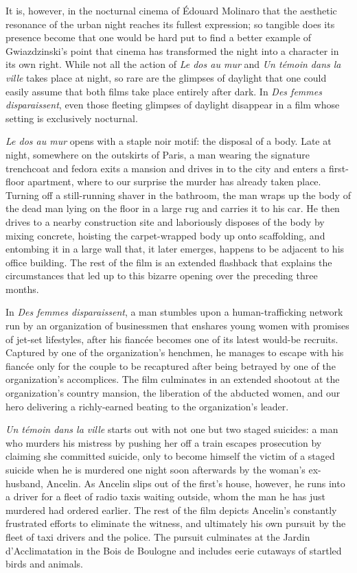 \documentclass[
  letterpaper,
  DIV=11,
  numbers=noendperiod,
  oneside]{scrartcl}
\begin{document}
\marginnote{\begin{footnotesize}

\end{footnotesize}}

It is, however, in the nocturnal cinema of Édouard Molinaro that the
aesthetic resonance of the urban night reaches its fullest expression;
so tangible does its presence become that one would be hard put to find
a better example of Gwiazdzinski's point that cinema has transformed the
night into a character in its own right. While not all the action of
\emph{Le dos au mur} and \emph{Un témoin dans la ville} takes place at
night, so rare are the glimpses of daylight that one could easily assume
that both films take place entirely after dark. In \emph{Des femmes
disparaissent}, even those fleeting glimpses of daylight disappear in a
film whose setting is exclusively nocturnal.

\emph{Le dos au mur} opens with a staple noir motif: the disposal of a
body. Late at night, somewhere on the outskirts of Paris, a man wearing
the signature trenchcoat and fedora exits a mansion and drives in to the
city and enters a first-floor apartment, where to our surprise the
murder has already taken place. Turning off a still-running shaver in
the bathroom, the man wraps up the body of the dead man lying on the
floor in a large rug and carries it to his car. He then drives to a
nearby construction site and laboriously disposes of the body by mixing
concrete, hoisting the carpet-wrapped body up onto scaffolding, and
entombing it in a large wall that, it later emerges, happens to be
adjacent to his office building. The rest of the film is an extended
flashback that explains the circumstances that led up to this bizarre
opening over the preceding three months.

In \emph{Des femmes disparaissent}, a man stumbles upon a
human-trafficking network run by an organization of businessmen that
enshares young women with promises of jet-set lifestyles, after his
fiancée becomes one of its latest would-be recruits. Captured by one of
the organization's henchmen, he manages to escape with his fiancée only
for the couple to be recaptured after being betrayed by one of the
organization's accomplices. The film culminates in an extended shootout
at the organization's country mansion, the liberation of the abducted
women, and our hero delivering a richly-earned beating to the
organization's leader.

\emph{Un témoin dans la ville} starts out with not one but two staged
suicides: a man who murders his mistress by pushing her off a train
escapes prosecution by claiming she committed suicide, only to become
himself the victim of a staged suicide when he is murdered one night
soon afterwards by the woman's ex-husband, Ancelin. As Ancelin slips out
of the first's house, however, he runs into a driver for a fleet of
radio taxis waiting outside, whom the man he has just murdered had
ordered earlier. The rest of the film depicts Ancelin's constantly
frustrated efforts to eliminate the witness, and ultimately his own
pursuit by the fleet of taxi drivers and the police. The pursuit
culminates at the Jardin d'Acclimatation in the Bois de Boulogne and
includes eerie cutaways of startled birds and animals.
\end{document}
